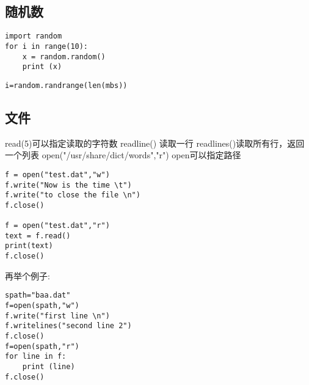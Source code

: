 \documentclass[twoside,11pt]{book}
\begin{document}
\subsection{随机数}

\begin{lstlisting}
import random
for i in range(10):
    x = random.random()
    print (x)
\end{lstlisting}

\begin{lstlisting}
i=random.randrange(len(mbs))
\end{lstlisting}



\subsection{文件}\label{sec:io:filea}
read(5)可以指定读取的字符数
readline() 读取一行
readlines()读取所有行，返回一个列表
open("/usr/share/dict/words","r") open可以指定路径
\begin{lstlisting}
f = open("test.dat","w")
f.write("Now is the time \t")
f.write("to close the file \n")
f.close()

f = open("test.dat","r")
text = f.read()
print(text)
f.close()
\end{lstlisting}

再举个例子:
\begin{lstlisting}
spath="baa.dat"
f=open(spath,"w")
f.write("first line \n")
f.writelines("second line 2")
f.close()
f=open(spath,"r")
for line in f:
    print (line)
f.close()
\end{lstlisting}
\end{document}
